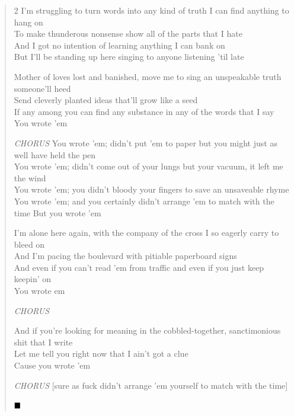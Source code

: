 \documentclass[11pt]{book}
\begin{document}
\newpage

\begin{verse}
\begin{multicols}{2}
\tiny
I'm struggling to turn words into any kind of truth I can find anything to hang on \\
To make thunderous nonsense show all of the parts that I hate \\
And I got no intention of learning anything I can bank on \\
But I'll be standing up here singing to anyone listening 'til late

Mother of loves lost and banished, move me to sing an unspeakable truth someone'll heed \\
Send cleverly planted ideas that'll grow like a seed \\
If any among you can find any substance in any of the words that I say \\
You wrote 'em

\hspace{2em} \emph{CHORUS}
\hspace{2em} You wrote 'em; didn't put 'em to paper but you might just as well have held the pen \\
\hspace{2em} You wrote 'em; didn't come out of your lungs but your vacuum, it left me the wind \\
\hspace{2em} You wrote 'em; you didn't bloody your fingers to save an unsaveable rhyme \\
\hspace{2em} You wrote 'em; and you certainly didn't arrange 'em to match with the time
\hspace{2em} But you wrote 'em

I'm alone here again, with the company of the cross I so eagerly carry to bleed on \\
And I'm pacing the boulevard with pitiable paperboard signs \\
And even if you can't read 'em from traffic and even if you just keep keepin' on \\
You wrote em

\hspace{2em} \emph{CHORUS}

And if you're looking for meaning in the cobbled-together, sanctimonious shit that I write \\
Let me tell you right now that I ain't got a clue \\
Cause you wrote 'em

\hspace{2em} \emph{CHORUS} [sure as fuck didn't arrange 'em yourself to match with the time]

$\hfill\blacksquare$

\end{multicols}
\end{verse}
\end{document}
